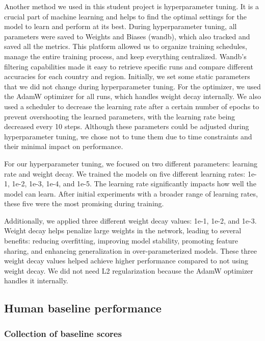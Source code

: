 Another method we used in this student project is hyperparameter tuning.
It is a crucial part of machine learning and helps to find the optimal
settings for the model to learn and perform at its best. During
hyperparameter tuning, all parameters were saved to Weights and Biases
(wandb), which also tracked and saved all the metrics. This platform
allowed us to organize training schedules, manage the entire training
process, and keep everything centralized. Wandb's filtering capabilities
made it easy to retrieve specific runs and compare different accuracies
for each country and region. Initially, we set some static parameters
that we did not change during hyperparameter tuning. For the optimizer,
we used the AdamW optimizer for all runs, which handles weight decay
internally. We also used a scheduler to decrease the learning rate after
a certain number of epochs to prevent overshooting the learned
parameters, with the learning rate being decreased every 10 steps.
Although these parameters could be adjusted during hyperparameter
tuning, we chose not to tune them due to time constraints and their
minimal impact on performance.

For our hyperparameter tuning, we focused on two different parameters:
learning rate and weight decay. We trained the models on five different
learning rates: 1e-1, 1e-2, 1e-3, 1e-4, and 1e-5. The learning rate
significantly impacts how well the model can learn. After initial
experiments with a broader range of learning rates, these five were the
most promising during training.

Additionally, we applied three different weight decay values: 1e-1,
1e-2, and 1e-3. Weight decay helps penalize large weights in the
network, leading to several benefits: reducing overfitting, improving
model stability, promoting feature sharing, and enhancing generalization
in over-parameterized models. These three weight decay values helped
achieve higher performance compared to not using weight decay. We did
not need L2 regularization because the AdamW optimizer handles it
internally.

\subsection{Human baseline
performance}\label{human-baseline-performance}

\subsubsection{Collection of baseline
scores}\label{collection-of-baseline-scores}

